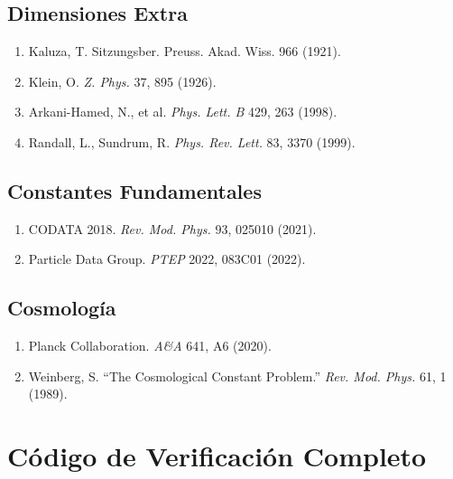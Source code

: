 \documentclass[12pt,a4paper,openany]{book}
\begin{document}
\section*{Dimensiones Extra}

\begin{enumerate}
    \item Kaluza, T. Sitzungsber. Preuss. Akad. Wiss. 966 (1921).
    \item Klein, O. \textit{Z. Phys.} 37, 895 (1926).
    \item Arkani-Hamed, N., et al. \textit{Phys. Lett. B} 429, 263 (1998).
    \item Randall, L., Sundrum, R. \textit{Phys. Rev. Lett.} 83, 3370 (1999).
\end{enumerate}

\section*{Constantes Fundamentales}

\begin{enumerate}
    \item CODATA 2018. \textit{Rev. Mod. Phys.} 93, 025010 (2021).
    \item Particle Data Group. \textit{PTEP} 2022, 083C01 (2022).
\end{enumerate}

\section*{Cosmología}

\begin{enumerate}
    \item Planck Collaboration. \textit{A\&A} 641, A6 (2020).
    \item Weinberg, S. ``The Cosmological Constant Problem.'' \textit{Rev. Mod. Phys.} 61, 1 (1989).
\end{enumerate}

\chapter{Código de Verificación Completo}
\end{document}
